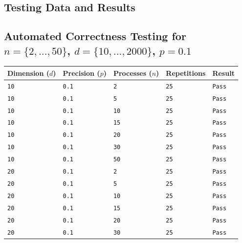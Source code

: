 \documentclass[11pt]{article}
\begin{document}
\begin{appendices}
{\color{indigo}
\section{Testing Data and Results}
\label{apdx:testresults}}

{\color{darkindigo}
\subsection{Automated Correctness Testing for $n=\{2,...,50\}$, $d=\{10,...,2000\}$, $p=0.1$}
\tiny{\label{apdx:autocorrtests}
}
\color{black}
\begin{center}
\begin{tabular}{|l|l|l|l|l|}
\hline
\textbf{Dimension ($d$)} & \textbf{Precision ($p$)} & \textbf{Processes ($n$)} & \textbf{Repetitions} & \textbf{Result} \\
\hline
\texttt{10} & \texttt{0.1} & \texttt{2} & \texttt{25} & {\color{forestgreen!70}\texttt{Pass}}\\
\texttt{10} & \texttt{0.1} & \texttt{5} & \texttt{25} & {\color{forestgreen!70}\texttt{Pass}}\\
\texttt{10} & \texttt{0.1} & \texttt{10} & \texttt{25} & {\color{forestgreen!70}\texttt{Pass}}\\
\texttt{10} & \texttt{0.1} & \texttt{15} & \texttt{25} & {\color{forestgreen!70}\texttt{Pass}}\\
\texttt{10} & \texttt{0.1} & \texttt{20} & \texttt{25} & {\color{forestgreen!70}\texttt{Pass}}\\
\texttt{10} & \texttt{0.1} & \texttt{30} & \texttt{25} & {\color{forestgreen!70}\texttt{Pass}}\\
\texttt{10} & \texttt{0.1} & \texttt{50} & \texttt{25} & {\color{forestgreen!70}\texttt{Pass}}\\
\texttt{20} & \texttt{0.1} & \texttt{2} & \texttt{25} & {\color{forestgreen!70}\texttt{Pass}}\\
\texttt{20} & \texttt{0.1} & \texttt{5} & \texttt{25} & {\color{forestgreen!70}\texttt{Pass}}\\
\texttt{20} & \texttt{0.1} & \texttt{10} & \texttt{25} & {\color{forestgreen!70}\texttt{Pass}}\\
\texttt{20} & \texttt{0.1} & \texttt{15} & \texttt{25} & {\color{forestgreen!70}\texttt{Pass}}\\
\texttt{20} & \texttt{0.1} & \texttt{20} & \texttt{25} & {\color{forestgreen!70}\texttt{Pass}}\\
\texttt{20} & \texttt{0.1} & \texttt{30} & \texttt{25} & {\color{forestgreen!70}\texttt{Pass}}\\

\end{tabular}
\end{center}}
\end{appendices}
\end{document}
